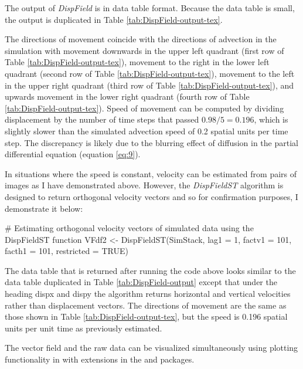 The output of \emph{DispField} is in data table format. Because the data
table is small, the output is duplicated in Table
\ref{tab:DispField-output-tex}.

The directions of movement coincide with the directions of advection in
the simulation with movement downwards in the upper left quadrant (first
row of Table \ref{tab:DispField-output-tex}), movement to the right in
the lower left quadrant (second row of Table
\ref{tab:DispField-output-tex}), movement to the left in the upper right
quadrant (third row of Table \ref{tab:DispField-output-tex}), and
upwards movement in the lower right quadrant (fourth row of Table
\ref{tab:DispField-output-tex}). Speed of movement can be computed by
dividing displacement by the number of time steps that passed
\(0.98/5 = 0.196\), which is slightly slower than the simulated
advection speed of 0.2 spatial units per time step. The discrepancy is
likely due to the blurring effect of diffusion in the partial
differential equation (equation \eqref{eq:9}).

In situations where the speed is constant, velocity can be estimated
from pairs of images as I have demonstrated above. However, the
\emph{DispFieldST} algorithm is designed to return orthogonal velocity
vectors and so for confirmation purposes, I demonstrate it below:

\begin{Schunk}
\begin{Sinput}
# Estimating orthogonal velocity vectors of simulated data using the DispFieldST function
VFdf2 <- DispFieldST(SimStack, lag1 = 1, factv1 = 101, facth1 = 101, restricted = TRUE)
\end{Sinput}
\end{Schunk}

The data table that is returned after running the code above looks
similar to the data table duplicated in Table \ref{tab:DispField-output}
except that under the heading dispx and dispy the algorithm returns
horizontal and vertical velocities rather than displacement vectors. The
directions of movement are the same as those shown in Table
\ref{tab:DispField-output-tex}, but the speed is 0.196 spatial units per
unit time as previously estimated.

The vector field and the raw data can be visualized simultaneously using
plotting functionality in  with extensions in the
 and  packages.

